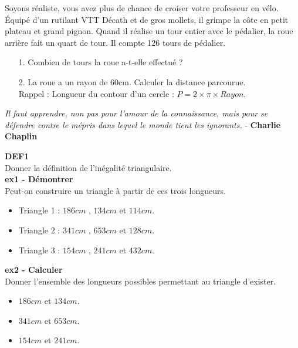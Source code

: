 Soyons réaliste, vous avez plus de chance de croiser votre professeur en vélo. Équipé d'un rutilant VTT Décath et de gros mollets, il grimpe la côte en petit plateau et grand pignon. Quand il réalise un tour entier avec le pédalier, la roue arrière fait un quart de tour. Il compte 126 tours de pédalier. 

\begin{enumerate}
  \item[1.] Combien de tours la roue a-t-elle effectué ?
  \item[2.] La roue a un rayon de 60cm. Calculer la distance parcourue. \\
    Rappel : Longueur du contour d'un cercle : $P = 2 \times \pi \times Rayon$.   
\end{enumerate}

\newpage

\begin{center}
  \textit{Il faut apprendre, non pas pour l'amour de la connaissance, mais pour se défendre contre le mépris dans lequel le monde tient les ignorants.} - \textbf{Charlie Chaplin}
\end{center}

\textbf{DEF1} \\

Donner la définition de l'inégalité triangulaire.\\

\textbf{ex1 - Démontrer} \\

Peut-on construire un triangle à partir de ces trois longueurs.

\begin{itemize}[label={$\bullet$}]
  \item Triangle 1 : $186cm$ , $134cm$  et $114cm$.
  \item Triangle 2 : $341cm$ , $653cm$ et $128cm$.
  \item Triangle 3 : $154cm$ , $241cm$ et $432cm$.
\end{itemize} 

\textbf{ex2 - Calculer} \\

Donner l'ensemble des longueurs possibles permettant au triangle d'exister. 

\begin{itemize}[label={$\bullet$}]
  \item $186cm$ et $134cm$.
  \item $341cm$ et $653cm$.
  \item $154cm$ et $241cm$.
\end{itemize}

